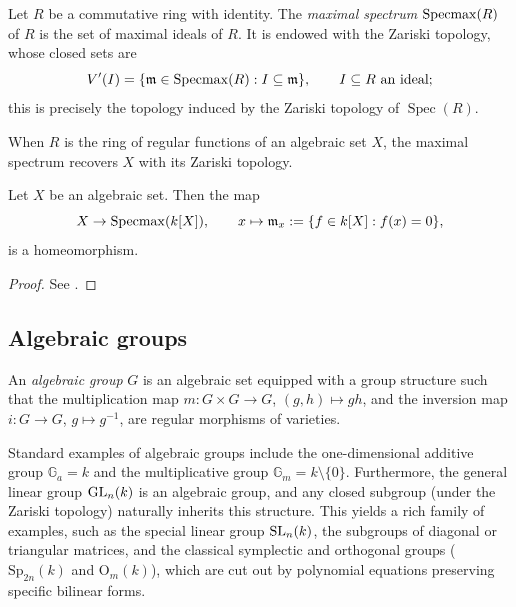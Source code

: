 \begin{definition}
    Let $R$ be a commutative ring with identity. The \emph{maximal spectrum} $\operatorname{Specmax}(R)$ of $R$ is the set of maximal ideals of $R$. It is endowed with the Zariski topology, whose closed sets are
    \[
        V'(I) = \{ \mathfrak{m} \in \operatorname{Specmax}(R) : I \subseteq \mathfrak{m} \}, \qquad I \subseteq R \text{ an ideal};
    \]
    this is precisely the topology induced by the Zariski topology of $\operatorname{Spec}(R)$.
\end{definition}

When $R$ is the ring of regular functions of an algebraic set $X$, the maximal spectrum recovers $X$ with its Zariski topology.
 
\begin{proposition}\label{prop:specmax-homeo}
    Let $X$ be an algebraic set. Then the map
    \[
        X \to \operatorname{Specmax}(k[X]), \qquad x \mapsto \mathfrak{m}_x := \{ f \in k[X] : f(x) = 0 \},
    \]
    is a homeomorphism.
\end{proposition}

\begin{proof}
	See \cite[\S~11.6.3]{tauvelLieAlgebrasAlgebraic2005}.
\end{proof}


\subsection{Algebraic groups}


\begin{definition}
    An \emph{algebraic group} $G$ is an algebraic set equipped with a group structure such that the multiplication map $m : G \times G \to G$, $(g,h) \mapsto gh$, and the inversion map $i : G \to G$, $g \mapsto g^{-1}$, are regular morphisms of varieties.
\end{definition}

Standard examples of algebraic groups include the one-dimensional additive group $\mathbb{G}_a = k$ and the multiplicative group $\mathbb{G}_m = k \setminus \{0\}$. Furthermore, the general linear group $\operatorname{GL}_n(k)$ is an algebraic group, and any closed subgroup (under the Zariski topology) naturally inherits this structure. This yields a rich family of examples, such as the special linear group $\operatorname{SL}_n(k)$, the subgroups of diagonal or triangular matrices, and the classical symplectic and orthogonal groups ($\mathrm{Sp}_{2n}(k)$ and $\mathrm{O}_{m}(k)$), which are cut out by polynomial equations preserving specific bilinear forms.

